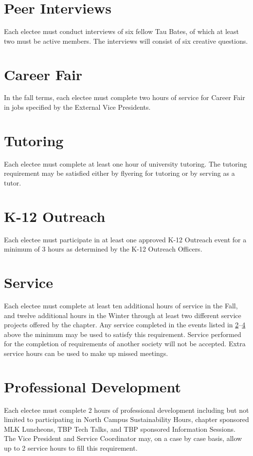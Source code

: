 \section{Peer Interviews} Each electee must conduct interviews of six fellow Tau Bates, of which at least two must be active members. The interviews will consist of six creative questions. 
\section{Career Fair}\label{ugrad:CF} In the fall terms, each electee must complete two hours of service for Career Fair in jobs specified by the External Vice Presidents. 
\section{Tutoring} Each electee must complete at least one hour of university tutoring. The tutoring requirement may be satisfied either by flyering for tutoring or by serving as a tutor.
\section{K-12 Outreach} \label{ugrad:MindSET} Each electee must participate in at least one approved K-12 Outreach event for a minimum of 3 hours as determined by the K-12 Outreach Officers.
\section{Service} Each electee must complete at least ten additional hours of service in the Fall, and twelve additional hours in the Winter through at least two different service projects offered by the chapter. Any service completed in the events listed in \ref{ugrad:CF}--\ref{ugrad:MindSET} above the minimum may be used to satisfy this requirement.  Service performed for the completion of requirements of another society will not be accepted. Extra service hours can be used to make up missed meetings.
\section{Professional Development} Each electee must complete 2 hours of professional development including but not limited to participating in North Campus Sustainability Hours, chapter sponsored MLK Luncheons, TBP Tech Talks, and TBP sponsored Information Sessions. The Vice President and Service Coordinator may, on a case by case basis, allow up to 2 service hours to fill this requirement. 
